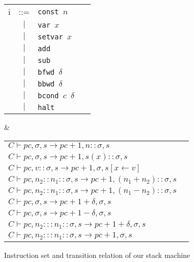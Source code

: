 \documentclass{llncs}
\begin{document}
\begin{figure}
  \centering
  \begin{twolistings}
    \begin{tabular}{rcll}
i & ::=   & \texttt{const $n$                     }\\
  & $|$   & \texttt{var   $x$                              }\\
  & $|$   & \texttt{setvar  $x$                            }\\
  & $|$   & \texttt{add                                        }\\
  & $|$   & \texttt{sub                                        }\\
  & $|$   & \texttt{bfwd $\delta$             }\\
  & $|$   & \texttt{bbwd $\delta$              }\\
  & $|$   & \texttt{bcond $c$ $\delta$ }\\
  & $|$   & \texttt{halt                                       }\\
      \end{tabular}
& \qquad 
      \begin{tabular}{ll}
$C \vdash pc,\sigma,s \to pc+1, n :: \sigma,s$ & \text{if $C(pc)$ = \texttt{add $n$}} \\
$C \vdash pc,\sigma,s \to pc+1, s(x) :: \sigma,s$ & \text{if $C(pc)$ = \texttt{var $x$}} \\
$C \vdash pc,v::\sigma,s \to pc+1, \sigma,s[x \leftarrow v]$ & \text{if $C(pc)$ = \texttt{setvar $x$}} \\
$C \vdash pc,n_2::n_1::\sigma,s \to pc+1, (n_1+n_2)::\sigma,s$ & \text{if $C(pc)$ = \texttt{add}} \\
$C \vdash pc,n_2::n_1::\sigma,s \to pc+1, (n_1-n_2)::\sigma,s$ & \text{if $C(pc)$ = \texttt{sub}} \\
$C \vdash pc,\sigma,s \to pc+1+\delta, \sigma,s$ & \text{if $C(pc)$ = \texttt{bfwd $\delta$}} \\
$C \vdash pc,\sigma,s \to pc+1-\delta, \sigma,s$ & \text{if $C(pc)$ = \texttt{bbwd $\delta$}} \\
$C \vdash pc,n_2:::n_1::\sigma,s \to pc+1+\delta, \sigma,s$ & \text{if $C(pc)$ = \texttt{bcond c $\delta$} and $c~n_1~n_2$} \\
$C \vdash pc,n_2:::n_1::\sigma,s \to pc+1, \sigma,s$ & \text{if $C(pc)$ = \texttt{bcond c $\delta$} and $\neg (c~n_1~n_2)$} \\
      \end{tabular}
\end{twolistings}
  \caption{Instruction set and transition relation of our stack machine}
  \label{fig:stack}
\end{figure}
\end{document}
